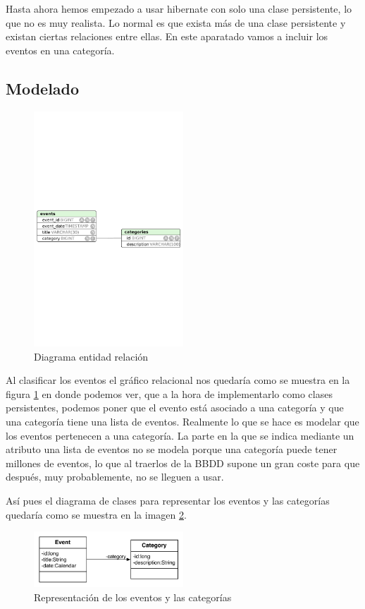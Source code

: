 \documentclass{article}
\begin{document}
	Hasta ahora hemos empezado a usar hibernate con solo una clase persistente, lo que no es muy realista. Lo normal es que exista más de una clase persistente y existan ciertas relaciones entre ellas. En este aparatado vamos a incluir los eventos en una categoría.

\subsection{Modelado}
\begin{figure}[h]
  \centering
    \includegraphics[width=0.5\textwidth]{commit04/img/ER.pdf}
  \caption{Diagrama entidad relación}
  \label{fig:c04:ER}
\end{figure}	

	Al clasificar los eventos el gráfico relacional nos quedaría como se muestra en la figura \ref{fig:c04:ER} en donde podemos ver, que a la hora de implementarlo como clases persistentes, podemos poner que el evento está asociado a una categoría y que una categoría tiene una lista de eventos. Realmente lo que se hace es modelar que los eventos pertenecen a una categoría. La parte en la que se indica mediante un atributo una lista de eventos no se modela porque una categoría puede tener millones de eventos, lo que al traerlos de la BBDD supone un gran coste para que después, muy probablemente, no se lleguen a usar.
	
	Así pues el diagrama de clases para representar los eventos y las categorías quedaría como se muestra en la imagen \ref{fig:c04:EventCategory}.

\begin{figure}[h]
  \centering
    \includegraphics[width=0.5\textwidth]{commit04/img/EventCategory.pdf}
  \caption{Representación de los eventos y las categorías}
  \label{fig:c04:EventCategory}
\end{figure}	
\end{document}
